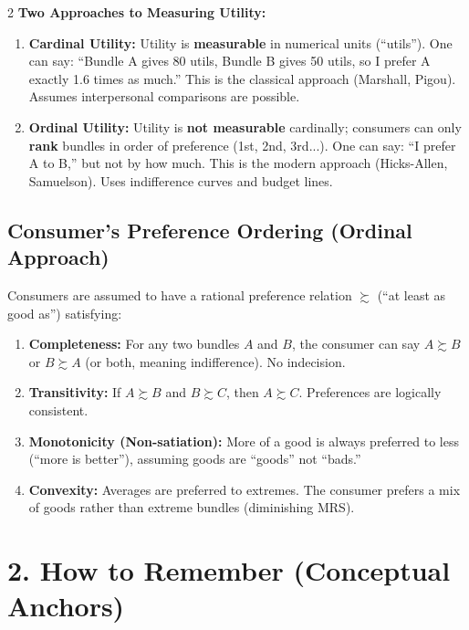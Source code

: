 \documentclass[10pt,a4paper]{article}
\begin{document}
\begin{multicols}{2}
\textbf{Two Approaches to Measuring Utility:}
\begin{enumerate}[leftmargin=*,nosep]
    \item \textbf{Cardinal Utility:} Utility is \textbf{measurable} in numerical units (``utils''). One can say: ``Bundle A gives 80 utils, Bundle B gives 50 utils, so I prefer A exactly 1.6 times as much.'' This is the classical approach (Marshall, Pigou). Assumes interpersonal comparisons are possible.
    \item \textbf{Ordinal Utility:} Utility is \textbf{not measurable} cardinally; consumers can only \textbf{rank} bundles in order of preference (1st, 2nd, 3rd...). One can say: ``I prefer A to B,'' but not by how much. This is the modern approach (Hicks-Allen, Samuelson). Uses indifference curves and budget lines.
\end{enumerate}

\subsection*{Consumer's Preference Ordering (Ordinal Approach)}
Consumers are assumed to have a rational preference relation $\succsim$ (``at least as good as'') satisfying:
\begin{enumerate}[leftmargin=*,nosep]
    \item \textbf{Completeness:} For any two bundles $A$ and $B$, the consumer can say $A \succsim B$ or $B \succsim A$ (or both, meaning indifference). No indecision.
    \item \textbf{Transitivity:} If $A \succsim B$ and $B \succsim C$, then $A \succsim C$. Preferences are logically consistent.
    \item \textbf{Monotonicity (Non-satiation):} More of a good is always preferred to less (``more is better''), assuming goods are ``goods'' not ``bads.''
    \item \textbf{Convexity:} Averages are preferred to extremes. The consumer prefers a mix of goods rather than extreme bundles (diminishing MRS).
\end{enumerate}

\section*{2. How to Remember (Conceptual Anchors)}


\end{multicols}
\end{document}
